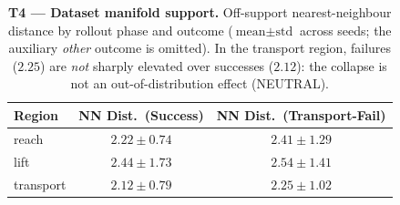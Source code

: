 \begin{table}[htbp]
\centering
\small
\caption{\textbf{T4 --- Dataset manifold support.} Off-support
nearest-neighbour distance by rollout phase and outcome
($\text{mean}\pm\text{std}$ across seeds; the auxiliary \emph{other}
outcome is omitted). In the transport region, failures
($2.25$) are \emph{not} sharply elevated over successes ($2.12$):
the collapse is not an out-of-distribution effect (NEUTRAL).}
\label{tab:T4_coverage}
\vspace{0.5em}
\begin{tabular}{lcc}
\toprule
\textbf{Region} & \textbf{NN Dist.\ (Success)} & \textbf{NN Dist.\ (Transport-Fail)} \\
\midrule
reach     & $2.22 \pm 0.74$ & $2.41 \pm 1.29$ \\
lift      & $2.44 \pm 1.73$ & $2.54 \pm 1.41$ \\
transport & $2.12 \pm 0.79$ & $2.25 \pm 1.02$ \\
\bottomrule
\end{tabular}
\end{table}
